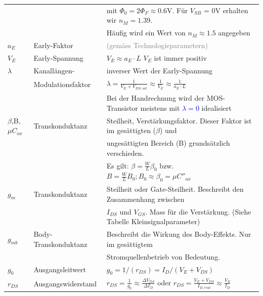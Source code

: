 \begin{tabular}{| l | l | l |}
                    &                       & mit $\Phi_0 = 2\Phi_F\approx0.6$V. Für $V_{SB}$ = 0V erhalten wir $n_M = 1.39.$ \\
                    &                       & Häufig wird ein Wert von $n_M\approx1.5$ angegeben \\
    \hline
    $a_E$           & Early-Faktor          & \textcolor{gray}{(gemäss Technologieparametern)} \\
    \hline
    $V_E$           & Early-Spannung        & $V_E \approx a_E \cdot L$ \hspace{10pt} $V_E$ ist immer positiv \\
    \hline
    $\lambda$       & Kanallängen-          & inverser Wert der Early-Spannung \\
                    & Modulationsfaktor     & $\lambda = \frac{1}{V_E + V_{DS,sat}}\approx\frac{1}{V_E}\approx\frac{1}{a_E \cdot L}$\\
                    &                       & Bei der Handrechnung wird der MOS-Transistor meistens mit \textcolor{blue}{$\lambda=0$} idealisiert\\
    \hline
    $\beta$,B,$\mu C_{ox}$       & Transkonduktanz       & Steilheit, Verstärkungsfaktor. Dieser Faktor ist im gesättigten ($\beta$) und \\
                    &                       & ungesättigten Bereich (B) grundsätzlich verschieden. \\
                    &                       & Es gilt: $\beta = \frac{W}{L}\beta_0$ bzw. $B = \frac{W}{L}B_0; B_0\approx \beta_0 = \mu C''_{ox}$ \\
    \hline
    $g_m$           & Transkonduktanz       & Steilheit oder Gate-Steilheit. Beschreibt den Zusammenhang zwischen \\
                    &                       & $I_{DS}$ und $V_{GS}$. Mass für die Verstärkung. (Siehe Tabelle Kleinsignalparameter) \\
    \hline
    $g_{mb}$        & Body-Transkonduktanz  & Beschreibt die Wirkung des Body-Effekts. Nur im gesättigtem \\
                    &                       & Stromquellenbetrieb von Bedeutung. \\
    \hline
    $g_0$           & Ausgangsleitwert      & $g_0 = 1/(r_{DS}) = I_D/(V_E + V_{DS})$\\
    \hline
    $r_{DS}$        & Ausgangswiderstand    & $r_{DS} = \frac{1}{g_0}\approx\frac{\Delta V_{DS}}{\Delta I_D}$ oder $r_{DS} = \frac{V_E + V_{DS}}{I_{D,real}}\approx\frac{V_E}{I_D}$\\

\end{tabular}

